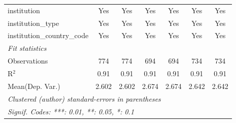 \begin{tabular}{lcccccc}
   institution                        & Yes           & Yes           & Yes     & Yes     & Yes         & Yes\\  
   institution\_type                  & Yes           & Yes           & Yes     & Yes     & Yes         & Yes\\  
   institution\_country\_code         & Yes           & Yes           & Yes     & Yes     & Yes         & Yes\\  
   \midrule
   \emph{Fit statistics}\\
   Observations                       & 774           & 774           & 694     & 694     & 734         & 734\\  
   R$^2$                              & 0.91          & 0.91          & 0.91    & 0.91    & 0.91        & 0.91\\  
Mean(Dep. Var.) & 2.602 & 2.602 & 2.674 & 2.674 & 2.642 & 2.642 \\
   \midrule \midrule
   \multicolumn{7}{l}{\emph{Clustered (author) standard-errors in parentheses}}\\
   \multicolumn{7}{l}{\emph{Signif. Codes: ***: 0.01, **: 0.05, *: 0.1}}\\
\end{tabular}
\par\endgroup
